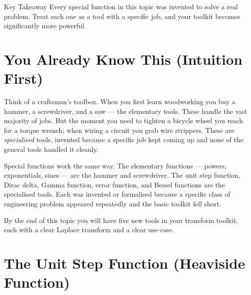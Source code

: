 \documentclass[12pt,a4paper]{article}
\begin{document}
\begin{learnbox}{Key Takeaway}
Every special function in this topic was invented to solve a real problem.
Treat each one as a tool with a specific job, and your toolkit becomes
significantly more powerful.
\end{learnbox}

\section{You Already Know This (Intuition First)}

Think of a craftsman's toolbox. When you first learn woodworking you buy a
hammer, a screwdriver, and a saw --- the elementary tools. These handle the
vast majority of jobs. But the moment you need to tighten a bicycle wheel you
reach for a torque wrench; when wiring a circuit you grab wire strippers. These
are \emph{specialised} tools, invented because a specific job kept coming up
and none of the general tools handled it cleanly.

Special functions work the same way. The elementary functions --- powers,
exponentials, sines --- are the hammer and screwdriver. The unit step function,
Dirac delta, Gamma function, error function, and Bessel functions are the
specialised tools. Each was invented or formalised because a specific class of
engineering problem appeared repeatedly and the basic toolkit fell short.

By the end of this topic you will have five new tools in your transform toolkit,
each with a clear Laplace transform and a clear use-case.

\section{The Unit Step Function (Heaviside Function)}
\end{document}

